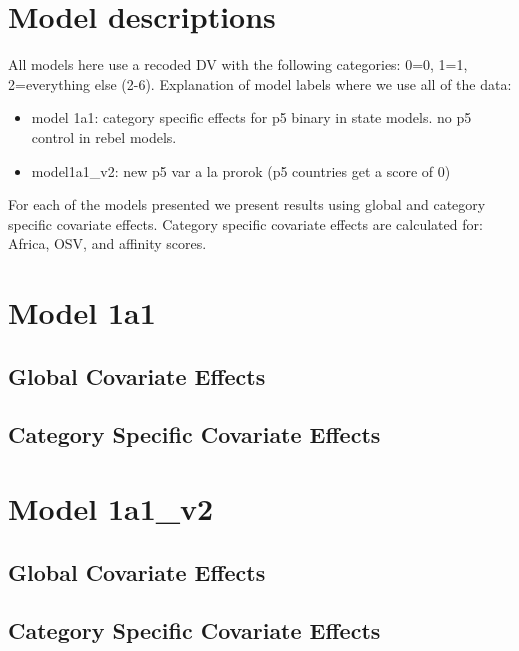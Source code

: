 \documentclass[]{article}
\begin{document}
\tableofcontents

\clearpage

\section{Model descriptions}

All models here use a recoded DV with the following categories: 0=0, 1=1, 2=everything else (2-6). Explanation of model labels where we use all of the data:

\begin{itemize}
	\item model 1a1: category specific effects for p5 binary in state models. no p5 control in rebel models.
	\item model1a1_v2: new p5 var a la prorok (p5 countries get a score of 0)
\end{itemize}

For each of the models presented we present results using global and category specific covariate effects. Category specific covariate effects are calculated for: Africa, OSV, and affinity scores.
\clearpage

\section{Model 1a1}
\subsection{Global Covariate Effects}

\clearpage
\subsection{Category Specific Covariate Effects}

\clearpage

\section{Model 1a1_v2}
\subsection{Global Covariate Effects}

\clearpage
\subsection{Category Specific Covariate Effects}

\clearpage
\end{document}
